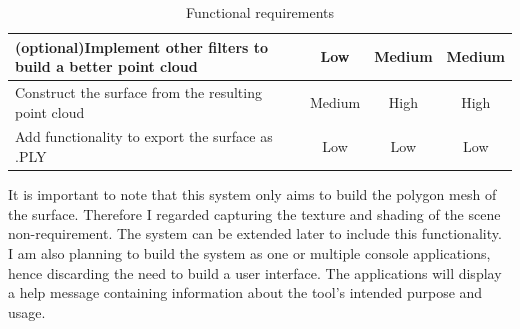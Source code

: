 \documentclass[12pt,a4paper,twoside,openright]{report}
\begin{document}
\begin{samepage}
\begin{center}
\begin{table}
\begin{tabularx}{\textwidth}{@{} Y c c c @{}}
(optional)Implement other filters to build a better point cloud         &   Low       &     Medium      &   Medium \\ \hline \addlinespace
Construct the surface from the resulting point cloud                    &   Medium       &     High      &   High \\ \hline \addlinespace
Add functionality to export the surface as .PLY                         &   Low       &     Low      &   Low \\ 
\bottomrule
\end{tabularx}
\caption{Functional requirements} 
\label{table:nonlin}
\end{table}
\end{center}
\end{samepage}
It is important to note that this system only aims to build the polygon mesh of the surface. Therefore I regarded capturing the texture and shading of the scene non-requirement. The system can be extended later to include this functionality.\\
I am also planning to build the system as one or multiple console applications, hence discarding the need to build a user interface. The applications will display a help message containing information about the tool's intended purpose and usage.
\end{document}
